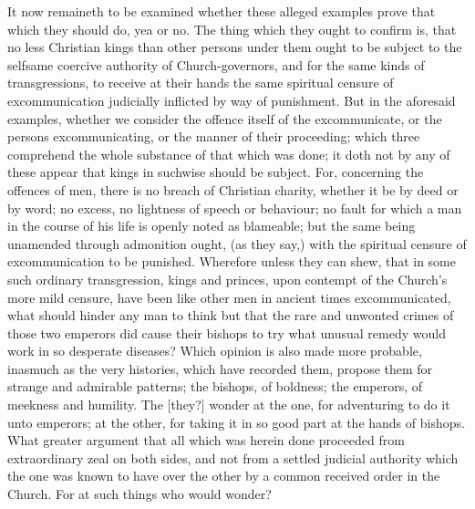 It now remaineth to be examined whether these alleged examples prove that which they should do, yea or no. The  thing which they ought to confirm is, that no less Christian kings than other persons under them ought to be subject to the selfsame coercive authority of Church-governors, and for the same kinds of transgressions, to receive at their hands the same spiritual censure of excommunication judicially inflicted by way of punishment. But in the aforesaid examples, whether we consider the offence itself of the excommunicate, or the persons excommunicating, or the manner of their proceeding; which three comprehend the whole substance of that which was done; it doth not by any of these appear that kings in suchwise should be subject. For, concerning the offences of men, there is no breach of Christian charity, whether it be by deed or by word; no excess, no lightness of speech or behaviour; no fault for which a man in the course of his life is openly noted as blameable; but the same being unamended through admonition ought, (as they say,) with the spiritual censure of excommunication to be punished. Wherefore unless they can shew, that in some such ordinary transgression, kings and princes, upon contempt of the Church’s more mild censure, have been like other men in ancient times excommunicated, what should hinder any man to think but that the rare and unwonted crimes of those two emperors did cause their bishops to try what unusual remedy would work in so desperate diseases? Which opinion is also made more probable, inasmuch as the very histories, which have recorded them, propose them for strange and admirable patterns; the bishops, of boldness; the emperors, of meekness and humility. The [they?] wonder at the one, for adventuring to do it unto emperors; at the other, for taking it in so good part at the hands of bishops. What greater argument that all which was herein done proceeded from extraordinary zeal on both sides, and not from a settled judicial authority which the one was known to have over the other by a common received order in the Church. For at such things who would wonder?

